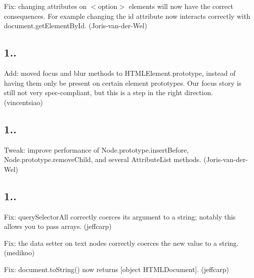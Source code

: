 \begin{DoxyItemize}
\item Fix\+: changing attributes on {\ttfamily $<$option$>$} elements will now have the correct consequences. For example changing the {\ttfamily id} attribute now interacts correctly with {\ttfamily document.\+get\+Element\+By\+Id}. (Joris-\/van-\/der-\/\+Wel)
\end{DoxyItemize}

\subsection*{1..}


\begin{DoxyItemize}
\item Add\+: moved {\ttfamily focus} and {\ttfamily blur} methods to {\ttfamily H\+T\+M\+L\+Element.\+prototype}, instead of having them only be present on certain element prototypes. Our focus story is still not very spec-\/compliant, but this is a step in the right direction. (vincentsiao)
\end{DoxyItemize}

\subsection*{1..}


\begin{DoxyItemize}
\item Tweak\+: improve performance of {\ttfamily Node.\+prototype.\+insert\+Before}, {\ttfamily Node.\+prototype.\+remove\+Child}, and several {\ttfamily Attribute\+List} methods. (Joris-\/van-\/der-\/\+Wel)
\end{DoxyItemize}

\subsection*{1..}


\begin{DoxyItemize}
\item Fix\+: {\ttfamily query\+Selector\+All} correctly coerces its argument to a string; notably this allows you to pass arrays. (jeffcarp)
\item Fix\+: the {\ttfamily data} setter on text nodes correctly coerces the new value to a string. (medikoo)
\item Fix\+: {\ttfamily document.\+to\+String()} now returns {\ttfamily \mbox{[}object H\+T\+M\+L\+Document\mbox{]}}. (jeffcarp)
\end{DoxyItemize}

